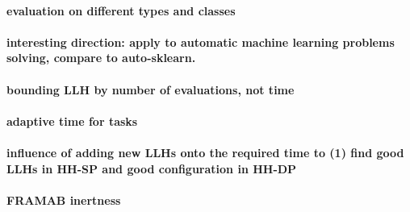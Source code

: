 \paragraph{evaluation on different types and classes}
\paragraph{interesting direction: apply to automatic machine learning problems solving, compare to auto-sklearn.}
\paragraph{bounding LLH by number of evaluations, not time}
\paragraph{adaptive time for tasks}
\paragraph{influence of adding new LLHs onto the required time to (1) find good LLHs in HH-SP and good configuration in HH-DP}
\paragraph{FRAMAB inertness}